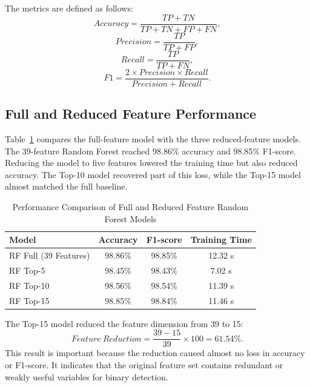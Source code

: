 \documentclass[journal]{IEEEtran}
\begin{document}
The metrics are defined as follows:
\begin{equation}
Accuracy=\frac{TP+TN}{TP+TN+FP+FN},
\end{equation}
\begin{equation}
Precision=\frac{TP}{TP+FP},
\end{equation}
\begin{equation}
Recall=\frac{TP}{TP+FN},
\end{equation}
\begin{equation}
F1=\frac{2\times Precision\times Recall}{Precision+Recall}.
\end{equation}

\subsection{Full and Reduced Feature Performance}

Table~\ref{tab:reduced_feature_performance} compares the full-feature model with the three reduced-feature models. The 39-feature Random Forest reached 98.86\% accuracy and 98.85\% F1-score. Reducing the model to five features lowered the training time but also reduced accuracy. The Top-10 model recovered part of this loss, while the Top-15 model almost matched the full baseline.

\begin{table}[htbp]
\caption{Performance Comparison of Full and Reduced Feature Random Forest Models}
\label{tab:reduced_feature_performance}
\centering
\begin{tabular}{|l|c|c|c|}
\hline
\textbf{Model} & \textbf{Accuracy} & \textbf{F1-score} & \textbf{Training Time} \\
\hline
RF Full (39 Features) & 98.86\% & 98.85\% & 12.32 s \\
RF Top-5 & 98.45\% & 98.43\% & 7.02 s \\
RF Top-10 & 98.56\% & 98.54\% & 11.39 s \\
RF Top-15 & 98.85\% & 98.84\% & 11.46 s \\
\hline
\end{tabular}
\end{table}

The Top-15 model reduced the feature dimension from 39 to 15:
\begin{equation}
Feature\ Reduction=\frac{39-15}{39}\times100=61.54\%.
\end{equation}
This result is important because the reduction caused almost no loss in accuracy or F1-score. It indicates that the original feature set contains redundant or weakly useful variables for binary detection.
\end{document}
